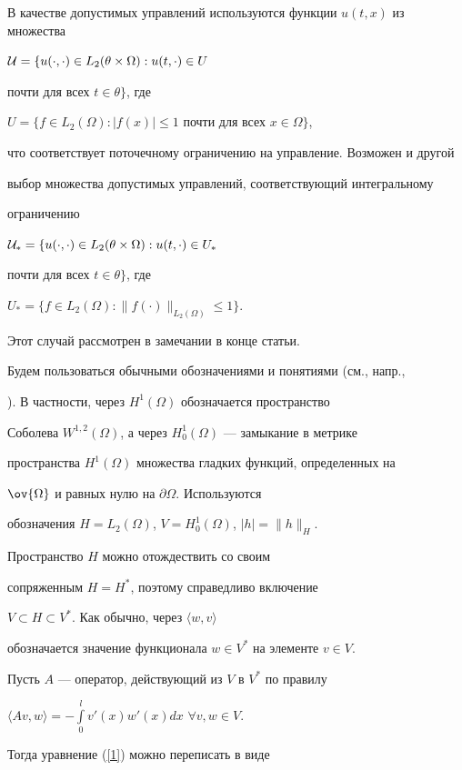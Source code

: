 В качестве допустимых управлений используются функции $u(t,x)$ из множества


${\cal U}=\{u(\cdot,\cdot)\in L_2(\theta\times\Omega): u(t,\cdot)\in U$


почти для всех $t\in\theta\}$, где


$U=\{f\in L_2(\Omega): |f(x)|\le1$ почти для всех $x\in\Omega\}$,


что соответствует поточечному ограничению на управление. Возможен и другой 


выбор множества допустимых управлений, соответствующий интегральному 


ограничению


${\cal U}_*=\{u(\cdot,\cdot)\in L_2(\theta\times\Omega): u(t,\cdot)\in U_*$


почти для всех $t\in\theta\}$, где


$U_*=\{f\in L_2(\Omega): \|f(\cdot)\|_{L_2(\Omega)}\le1\}$.


Этот случай рассмотрен в замечании в конце статьи.





Будем пользоваться  обычными обозначениями и понятиями (см., напр., 


\cite{L}). В частности, через $H^1 (\Omega)$ обозначается пространство


Соболева $ W^{1,2} (\Omega)$, а через $H^1_0(\Omega)$ --- замыкание в метрике


пространства $H^1(\Omega)$ множества гладких функций, определенных на


$\ov{\Omega} $ и равных нулю на $ \partial \Omega$. Используются


обозначения $H=L_2(\Omega)$, $V=H^1_0(\Omega)$, $ | h|  = \| h \|_H$.


Пространство $H$ можно отождествить со своим


сопряженным $H=H^* $, поэтому справедливо включение 


$V \subset H \subset V^*$. Как обычно, через $\langle  w, v \rangle$


обозначается значение функционала $w \in  V^*$ на элементе $v \in V$.


 


Пусть $A$ --- оператор, действующий из $V$ в $V^*$ по правилу


$\langle Av,w\rangle=-\int\limits_0^lv'(x)w'(x)dx$ $\forall v,w\in V$.


Тогда уравнение (\ref{1}) можно переписать в виде


